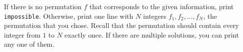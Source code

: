 
    If there is no permutation $f$ that corresponds to the given information, print \verb|impossible|.
    Otherwise, print one line with $N$ integers $f_1, f_2,  \dots, f_N$, the permutation that you chose. Recall that the permutation 
    should contain every integer from $1$ to $N$ exactly once. If there are multiple solutions, you can print any one of them.
